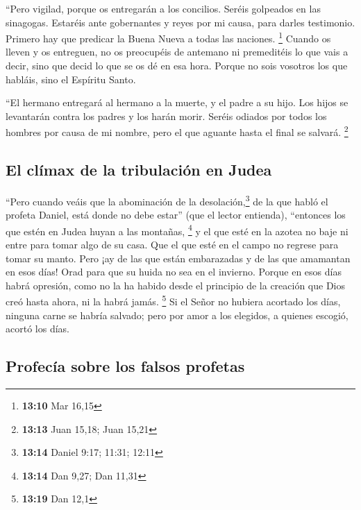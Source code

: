 \begin{paracol}{2}
 ``Pero vigilad, porque os entregarán a los concilios.
Seréis golpeados en las sinagogas. Estaréis ante gobernantes y reyes por
mi causa, para darles testimonio.  Primero hay que
predicar la Buena Nueva a todas las naciones. \footnote{\textbf{13:10}
  Mar 16,15}  Cuando os lleven y os entreguen, no os
preocupéis de antemano ni premeditéis lo que vais a decir, sino que
decid lo que se os dé en esa hora. Porque no sois vosotros los que
habláis, sino el Espíritu Santo.

 ``El hermano entregará al hermano a la muerte, y el
padre a su hijo. Los hijos se levantarán contra los padres y los harán
morir.  Seréis odiados por todos los hombres por causa de
mi nombre, pero el que aguante hasta el final se salvará. \footnote{\textbf{13:13}
  Juan 15,18; Juan 15,21}

\hypertarget{el-cluxedmax-de-la-tribulaciuxf3n-en-judea}{%
\subsection{El clímax de la tribulación en
Judea}\label{el-cluxedmax-de-la-tribulaciuxf3n-en-judea}}

 ``Pero cuando veáis que la abominación de la
desolación,\footnote{\textbf{13:14} Daniel 9:17; 11:31; 12:11} de la que
habló el profeta Daniel, está donde no debe estar'' (que el lector
entienda), ``entonces los que estén en Judea huyan a las montañas,
\footnote{\textbf{13:14} Dan 9,27; Dan 11,31}  y el que
esté en la azotea no baje ni entre para tomar algo de su casa.
 Que el que esté en el campo no regrese para tomar su
manto.  Pero ¡ay de las que están embarazadas y de las
que amamantan en esos días!  Orad para que su huida no
sea en el invierno.  Porque en esos días habrá opresión,
como no la ha habido desde el principio de la creación que Dios creó
hasta ahora, ni la habrá jamás. \footnote{\textbf{13:19} Dan 12,1}
 Si el Señor no hubiera acortado los días, ninguna carne
se habría salvado; pero por amor a los elegidos, a quienes escogió,
acortó los días.

\hypertarget{profecuxeda-sobre-los-falsos-profetas}{%
\subsection{Profecía sobre los falsos
profetas}\label{profecuxeda-sobre-los-falsos-profetas}}


\end{paracol}
